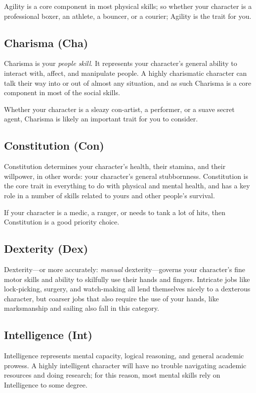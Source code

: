 Agility is a core component in most physical skills; so whether your character is a professional boxer, an athlete, a bouncer, or a courier; Agility is the trait for you.

\subsection{Charisma (Cha)}
Charisma is your \textit{people skill}.
It represents your character's general ability to interact with, affect, and manipulate people.
A highly charismatic character can talk their way into or out of almost any situation, and as such Charisma is a core component in most of the social skills.

Whether your character is a sleazy con-artist, a performer, or a suave secret agent, Charisma is likely an important trait for you to consider.

\subsection{Constitution (Con)}
Constitution determines your character's health, their stamina, and their willpower, in other words: your character's general stubbornness.
Constitution is the core trait in everything to do with physical and mental health, and has a key role in a number of skills related to yours and other people's survival.

If your character is a medic, a ranger, or needs to tank a lot of hits, then Constitution is a good priority choice.

\subsection{Dexterity (Dex)}
Dexterity---or more accurately: \textit{manual} dexterity---governs your character's fine motor skills and ability to skilfully use their hands and fingers.
Intricate jobs like lock-picking, surgery, and watch-making all lend themselves nicely to a dexterous character, but coarser jobs that also require the use of your hands, like marksmanship and sailing also fall in this category.


\subsection{Intelligence (Int)}
Intelligence represents mental capacity, logical reasoning, and general academic prowess.
A highly intelligent character will have no trouble navigating academic resources and doing research; for this reason, most mental skills rely on Intelligence to some degree.

